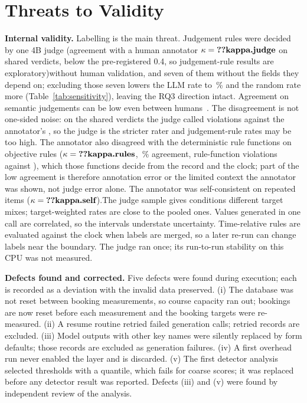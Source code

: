 \documentclass[conference]{IEEEtran}
\begin{document}
\section{Threats to Validity}
\label{sec:threats}

\textbf{Internal validity.} Labelling is the main threat. Judgement rules were decided by one 4B judge
\ifhumanlabels (agreement with a human annotator $\kappa=\R{kappa.judge}$ on  shared
verdicts, below the pre-registered 0.4, so judgement-rule results are exploratory)\else without human
validation\fi, and seven of them without the fields they depend on; excluding those seven
lowers the LLM rate to \,\% and the random rate more (Table~\ref{tab:sensitivity}),
leaving the RQ3 direction intact. Agreement on semantic judgements can be low even between
humans~\cite{calo2026semanticgap}.\ifhumanlabels{} The disagreement is not one-sided noise: on the
shared verdicts the judge called  violations against the annotator's
, so the judge is the stricter rater and judgement-rule rates may be too high. The
annotator also disagreed with the deterministic rule functions on objective rules
($\kappa=\R{kappa.rules}$, \,\% agreement,  rule-function violations
against ), which those functions decide from the record and the clock; part of the
low agreement is therefore annotation error or the limited context the annotator was shown, not judge
error alone. The annotator was self-consistent on repeated items ($\kappa=\R{kappa.self}$).\fi The judge sample gives conditions different target mixes;
target-weighted rates are close to the pooled ones. Values generated in one call are correlated, so
the intervals understate uncertainty. Time-relative rules are evaluated against the clock when labels
are merged, so a later re-run can change labels near the boundary. The judge ran once; its run-to-run
stability on this CPU was not measured.

\textbf{Defects found and corrected.} Five defects were found during execution; each is recorded as a
deviation with the invalid data preserved. (i) The database was not reset between booking
measurements, so course capacity ran out; bookings are now reset before each measurement and the
booking targets were re-measured. (ii) A resume routine retried failed generation calls; retried
records are excluded. (iii) Model outputs with other key names were silently replaced by form
defaults; those records are excluded as generation failures. (iv) A first overhead run never enabled
the layer and is discarded. (v) The first detector analysis selected thresholds with a quantile, which
fails for coarse scores; it was replaced before any detector result was reported. Defects (iii) and
(v) were found by independent review of the analysis.
\end{document}
